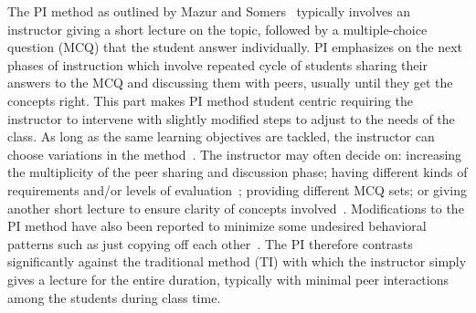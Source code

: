 \documentclass[twocolumn,secnumarabic,amssymb, nobibnotes, aps, prd]{revtex4-2}
\begin{document}
    The PI method as outlined by Mazur and Somers~\cite{mazur1997peer} typically involves an instructor giving a short lecture on the topic, followed by a multiple-choice question (MCQ) that the student answer individually.
    PI emphasizes on the next phases of instruction which involve repeated cycle of students sharing their answers to the MCQ and discussing them with peers, usually until they get the concepts right.
    This part makes PI method student centric requiring the instructor to intervene with slightly modified steps to adjust to the needs of the class.
    As long as the same learning objectives are tackled, the instructor can choose variations in the method~\cite{smith2009peer}.
    The instructor may often decide on: increasing the multiplicity of the peer sharing and discussion phase; having different kinds of requirements and/or levels of evaluation~\cite{crouch2001peer}; providing different MCQ sets; or giving another short lecture to ensure clarity of concepts involved~\cite{lasry2008peer}.
    Modifications to the PI method have also been reported to minimize some undesired behavioral patterns such as just copying off each other~\cite{smith2009peer}.
    The PI therefore contrasts significantly against the traditional method (TI) with which the instructor simply gives a lecture for the entire duration, typically with minimal peer interactions among the students during class time.
    

%
    
\end{document}
